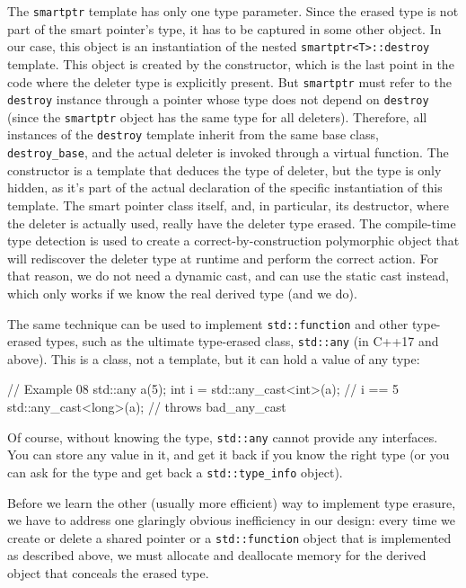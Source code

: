 The \texttt{smartptr} template has only one type parameter. Since the erased type is not part of the smart pointer's type, it has to be captured in some other object. In our case, this object is an instantiation of the nested \texttt{smartptr\textless{}T\textgreater{}::destroy} template. This object is created by the constructor, which is the last point in the code where the deleter type is explicitly present. But \texttt{smartptr} must refer to the \texttt{destroy} instance through a pointer whose type does not depend on \texttt{destroy} (since the \texttt{smartptr} object has the same type for all deleters). Therefore, all instances of the \texttt{destroy} template inherit from the same base class, \texttt{destroy\_base}, and the actual deleter is invoked through a virtual function. The constructor is a template that deduces the type of deleter, but the type is only hidden, as it's part of the actual declaration of the specific instantiation of this template. The smart pointer class itself, and, in particular, its destructor, where the deleter is actually used, really have the deleter type erased. The compile-time type detection is used to create a correct-by-construction polymorphic object that will rediscover the deleter type at runtime and perform the correct action. For that reason, we do not need a dynamic cast, and can use the static cast instead, which only works if we know the real derived type (and we do).

The same technique can be used to implement \texttt{std::function} and other type-erased types, such as the ultimate type-erased class, \texttt{std::any} (in C++17 and above). This is a class, not a template, but it can hold a value of any type:

\begin{code}
// Example 08
std::any a(5);
int i = std::any_cast<int>(a);    // i == 5
std::any_cast<long>(a);        // throws bad_any_cast
\end{code}

Of course, without knowing the type, \texttt{std::any} cannot provide any interfaces. You can store any value in it, and get it back if you know the right type (or you can ask for the type and get back a \texttt{std::type\_info} object).

Before we learn the other (usually more efficient) way to implement type erasure, we have to address one glaringly obvious inefficiency in our design: every time we create or delete a shared pointer or a \texttt{std::function} object that is implemented as described above, we must allocate and deallocate memory for the derived object that conceals the erased type.

